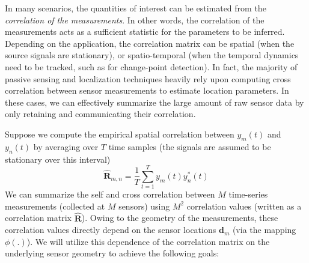 In many scenarios, the quantities of interest can be estimated from the {\em correlation of the measurements}. In other words, the correlation of the measurements acts as a sufficient statistic for the parameters to be inferred. Depending on the application, the correlation matrix can be spatial (when the source signals are stationary), or spatio-temporal (when the temporal dynamics need to be tracked, such as for change-point detection). In fact, the majority of passive sensing and localization techniques heavily rely upon computing cross correlation between sensor measurements to estimate location parameters. In these cases, we can effectively summarize the large amount of raw sensor data by only retaining and communicating their correlation. 

 Suppose we compute the empirical spatial correlation between $y_m(t)$ and $y_n(t)$  by averaging over $T$ time samples (the signals are assumed to be stationary over this interval) %
\begin{equation}
\mathbf{\hat{R}}_{m,n} = \frac{1}{T}\sum_{t=1}^{T} y_m (t) y^*_n (t)  \label{eq:corr}
\end{equation} 
We can summarize the self and cross correlation between $M$ time-series measurements (collected at $M$ sensors) using $M^2$ correlation values (written as a correlation matrix $\mathbf{\hat{R}}$). Owing to the geometry of the measurements, these correlation values directly depend on the sensor locations $\mathbf{d}_m$  (via the mapping $\phi(.)$). We will utilize this dependence of the correlation matrix on the underlying sensor geometry to achieve the following goals:

